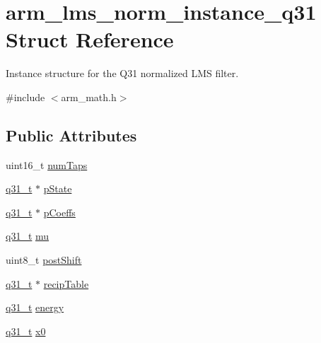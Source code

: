 \hypertarget{structarm__lms__norm__instance__q31}{}\section{arm\+\_\+lms\+\_\+norm\+\_\+instance\+\_\+q31 Struct Reference}
\label{structarm__lms__norm__instance__q31}


Instance structure for the Q31 normalized L\+MS filter.  




{\ttfamily \#include $<$arm\+\_\+math.\+h$>$}

\subsection*{Public Attributes}
\begin{DoxyCompactItemize}
\item 
uint16\+\_\+t \hyperlink{structarm__lms__norm__instance__q31_a28e4c085af69c9c3e2e95dacf8004c3e}{num\+Taps}
\item 
\hyperlink{arm__math_8h_adc89a3547f5324b7b3b95adec3806bc0}{q31\+\_\+t} $\ast$ \hyperlink{structarm__lms__norm__instance__q31_a6b25c96cf048b77078d62f4252a01ec4}{p\+State}
\item 
\hyperlink{arm__math_8h_adc89a3547f5324b7b3b95adec3806bc0}{q31\+\_\+t} $\ast$ \hyperlink{structarm__lms__norm__instance__q31_a57a64c1ff102d033c1bd05043f1d9955}{p\+Coeffs}
\item 
\hyperlink{arm__math_8h_adc89a3547f5324b7b3b95adec3806bc0}{q31\+\_\+t} \hyperlink{structarm__lms__norm__instance__q31_ad3dd2a2406e02fdaa7782ba6c3940a64}{mu}
\item 
uint8\+\_\+t \hyperlink{structarm__lms__norm__instance__q31_a28d7b9e437817f83397e081967e90f3c}{post\+Shift}
\item 
\hyperlink{arm__math_8h_adc89a3547f5324b7b3b95adec3806bc0}{q31\+\_\+t} $\ast$ \hyperlink{structarm__lms__norm__instance__q31_a85836d0907077b9ac660f7bbbaa9d694}{recip\+Table}
\item 
\hyperlink{arm__math_8h_adc89a3547f5324b7b3b95adec3806bc0}{q31\+\_\+t} \hyperlink{structarm__lms__norm__instance__q31_a3c0ae42869afec8555dc8e3a7ef9b386}{energy}
\item 
\hyperlink{arm__math_8h_adc89a3547f5324b7b3b95adec3806bc0}{q31\+\_\+t} \hyperlink{structarm__lms__norm__instance__q31_a47c4466d644e0d8ba407995adfa9b917}{x0}
\end{DoxyCompactItemize}


